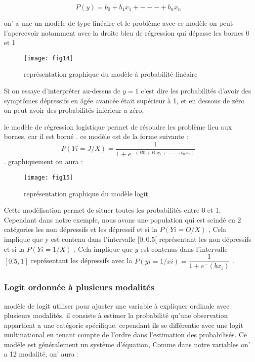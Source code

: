 \documentclass[a4paper]{article}
\begin{document}
 $$P(y) = b_0 + b_1x_1 + - - - +  b_nx_n $$ 

on’ a une un modèle de type linéaire et le problème avec ce modèle on peut l’apercevoir notamment avec la droite bleu de régression qui dépasse les bornes 0 et 1 
 
 \begin{figure}[h!]
 	\centering
 	\texttt{[image: fig14]}
 	\caption{représentation graphique du modèle à probabilité linéaire}
 	\label{fig:fig14}
 \end{figure}

Si on essaye d'interpréter au-dessus de $ y = 1 $ c'est dire les probabilités d’avoir des symptômes dépressifs en âgée avancée était supérieur à 1, et en dessous de zéro on peut avoir des probabilités inférieur a zéro.
 
le modèle de régression logistique permet de résoudre les problème lieu aux bornes, car il est borné .
ce modèle est de la forme suivante :  $$ P(Yi = J/X) = \dfrac{1}{1 + e^{-(B0 +B_1x_1 + -- + b_nx_n)}} $$.
graphiquement on aura :

 \begin{figure}[h!]
 	\centering
 	\texttt{[image: fig15]}
 	\caption{ représentation graphique du modèle logit}
 	\label{fig:fig15}
 \end{figure}
 
 Cette modélisation permet de situer toutes les probabilités entre 0 et 1.
 Cependant dans notre exemple, nous avons une population qui est scindé en 2 catégories les non dépressifs et les dépressif et si la  $P(Yi = O/X)$ , Cela implique que y est contenu dans l'intervalle $[ 0  ,  0.5 [$ représentant les non dépressifs et si la  $P(Yi = 1/X)$  , Cela implique que $y$ est contenus dans l’intervalle $[ 0.5  ,  1 ]$ représentant les dépressifs avec la $ P(yi = 1/xi) = \dfrac{1}{1 + e^-{(bx_i)}}$ . 
 
 \subsubsection{Logit ordonnée à plusieurs modalités} 
 
 modèle de logit utiliser pour ajuster une variable  à expliquer ordinale avec plusieurs modalités, il consiste à estimer la probabilité qu’une observation appartient a une catégorie spécifique. cependant ils se différentie avec une logit multinational en tenant compte de l’ordre dans l’estimation des probabilisés. Ce modèle est généralement un système d’équation, Comme dans notre variables on’ a 12 modalité, on’ aura :
 
\end{document}
